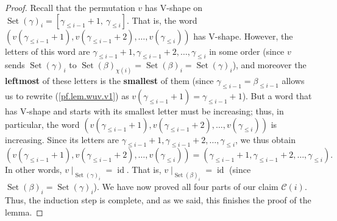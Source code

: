 \documentclass[10pt,a4paper]{amsart}
\newcommand{\id}{\operatorname{id}} %
\newcommand{\tup}[1]{\left( #1 \right)}
\begin{document}
\begin{proof}
Recall that the permutation $v$ has V-shape on $\operatorname*{Set}\left(
\gamma\right)  _{i} =\left[
\gamma_{\leq i-1}+1,\ \gamma_{\leq i}\right] $. That is, the word
$\tup{v\tup{\gamma_{\leq i-1} + 1}, v\tup{\gamma_{\leq i-1} + 2}, \ldots,
v\tup{\gamma_{\leq i}}}$ has V-shape.
However, the letters of this word are $\gamma_{\leq i-1} + 1,
\gamma_{\leq i-1} + 2, \ldots, \gamma_{\leq i}$ in some order
(since $v$ sends $\operatorname*{Set}\left(
\gamma\right)  _{i}$ to $\operatorname*{Set}\left(  \beta\right)
_{\chi\left(  i\right)  }=\operatorname*{Set}\left(  \beta\right)
_{i}=\operatorname*{Set}\left(  \gamma\right)  _{i}$),
and moreover the \textbf{leftmost} of these letters is the
\textbf{smallest} of them (since $\gamma_{\leq
i-1}=\beta_{\leq i-1}$ allows us to rewrite (\ref{pf.lem.wuv.v1}) as $v\left(
\gamma_{\leq i-1}+1\right)  =\gamma_{\leq i-1}+1$).
But a word that has V-shape and starts with its smallest letter
must be increasing; thus, in particular, the word
$\tup{v\tup{\gamma_{\leq i-1} + 1}, v\tup{\gamma_{\leq i-1} + 2}, \ldots,
v\tup{\gamma_{\leq i}}}$ is increasing.
Since its letters are $\gamma_{\leq i-1} + 1,
\gamma_{\leq i-1} + 2, \ldots, \gamma_{\leq i}$, we thus obtain
\[
\tup{v\tup{\gamma_{\leq i-1} + 1}, v\tup{\gamma_{\leq i-1} + 2}, \ldots,
v\tup{\gamma_{\leq i}}}
= \tup{\gamma_{\leq i-1} + 1,
\gamma_{\leq i-1} + 2, \ldots, \gamma_{\leq i}}.
\]
In other words,
$\left. v\mid_{\operatorname*{Set}\left(  \gamma\right)  _{i}}\right.
= \id $.
That is, $\left. v\mid_{\operatorname*{Set}\left(  \beta\right)  _{i}}%
\right. = \id $ (since $\operatorname*{Set}\left(  \beta\right)
_{i}=\operatorname*{Set}\left(  \gamma\right)  _{i}$).
We have now proved all four parts of our claim $\mathcal{C}\left(  i\right)
$. Thus, the induction step is complete, and as we said, this finishes the
proof of the lemma.
\end{proof}
\end{document}
